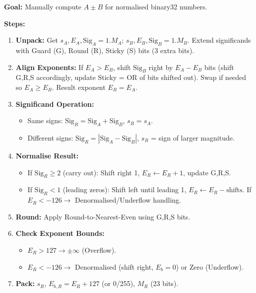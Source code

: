 \documentclass[11pt]{article}
\begin{document}
\begin{methode}
\textbf{Goal:} Manually compute $A \pm B$ for normalised binary32 numbers.\par
\textbf{Steps:}
\begin{enumerate}
    \item \textbf{Unpack:} Get $s_A, E_A, \text{Sig}_A = 1.M_A$; $s_B, E_B, \text{Sig}_B = 1.M_B$. Extend significands with Guard (G), Round (R), Sticky (S) bits (3 extra bits).
    \item \textbf{Align Exponents:} If $E_A > E_B$, shift $\text{Sig}_B$ right by $E_A - E_B$ bits (shift G,R,S accordingly, update Sticky = OR of bits shifted out). Swap if needed so $E_A \ge E_B$. Result exponent $E_R = E_A$.
    \item \textbf{Significand Operation:}
          \begin{itemize}
              \item Same signs: $\text{Sig}_R = \text{Sig}_A + \text{Sig}_B$, $s_R = s_A$.
              \item Different signs: $\text{Sig}_R = |\text{Sig}_A - \text{Sig}_B|$, $s_R$ = sign of larger magnitude.
          \end{itemize}
    \item \textbf{Normalise Result:}
          \begin{itemize}
              \item If $\text{Sig}_R \ge 2$ (carry out): Shift right 1, $E_R \leftarrow E_R + 1$, update G,R,S.
              \item If $\text{Sig}_R < 1$ (leading zeros): Shift left until leading 1, $E_R \leftarrow E_R - \text{shifts}$. If $E_R < -126 \to$ Denormalised/Underflow handling.
          \end{itemize}
    \item \textbf{Round:} Apply Round-to-Nearest-Even using G,R,S bits.
    \item \textbf{Check Exponent Bounds:}
          \begin{itemize}
              \item $E_R > 127 \to \pm\infty$ (Overflow).
              \item $E_R < -126 \to$ Denormalised (shift right, $E_b=0$) or Zero (Underflow).
          \end{itemize}
    \item \textbf{Pack:} $s_R$, $E_{b,R} = E_R + 127$ (or 0/255), $M_R$ (23 bits).
\end{enumerate}
\end{methode}
\end{document}
